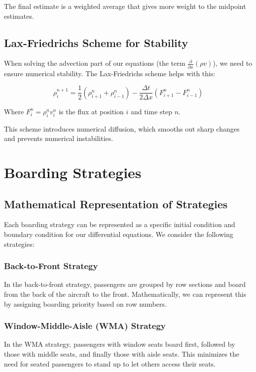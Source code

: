 \documentclass[a4paper,12pt]{article}
\begin{document}
The final estimate is a weighted average that gives more weight to the midpoint estimates.

\subsection{Lax-Friedrichs Scheme for Stability}

When solving the advection part of our equations (the term $\frac{\partial}{\partial x}(\rho v)$), we need to ensure numerical stability. The Lax-Friedrichs scheme helps with this:

\begin{equation}
\rho_i^{n+1} = \frac{1}{2}(\rho_{i+1}^n + \rho_{i-1}^n) - \frac{\Delta t}{2\Delta x}(F_{i+1}^n - F_{i-1}^n)
\end{equation}

Where $F_i^n = \rho_i^n v_i^n$ is the flux at position $i$ and time step $n$.

This scheme introduces numerical diffusion, which smooths out sharp changes and prevents numerical instabilities.

\section{Boarding Strategies}

\subsection{Mathematical Representation of Strategies}

Each boarding strategy can be represented as a specific initial condition and boundary condition for our differential equations. We consider the following strategies:

\subsubsection{Back-to-Front Strategy}

In the back-to-front strategy, passengers are grouped by row sections and board from the back of the aircraft to the front. Mathematically, we can represent this by assigning boarding priority based on row numbers.

\subsubsection{Window-Middle-Aisle (WMA) Strategy}

In the WMA strategy, passengers with window seats board first, followed by those with middle seats, and finally those with aisle seats. This minimizes the need for seated passengers to stand up to let others access their seats.
\end{document}
